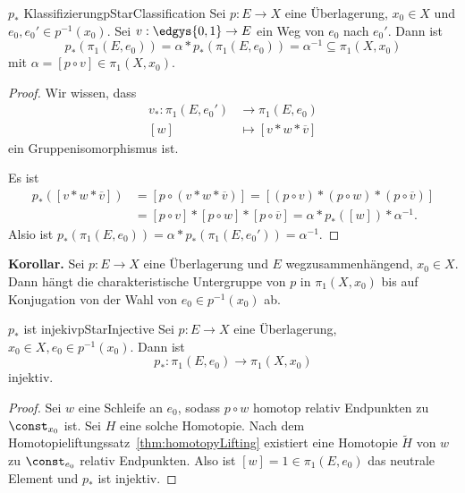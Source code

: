 \documentclass[language=ngerman]{TemplateLecture} %
\begin{document}
\begin{thm}{$p_*$ Klassifizierung}{pStarClassification}
    Sei $p: E \to X$ eine Überlagerung, $x_0 \in X$ und $e_0, e_0' \in p^{-1}(x_0)$. Sei $v: \edgys{0,1} \to E$ ein Weg von $e_0$ nach $e_0'$. Dann ist 
    \begin{equation*}
        p_*(\pi_1(E, e_0)) = \alpha * p_*(\pi_1(E,e_0)) = \alpha^{-1} \subseteq \pi_1(X, x_0)
    \end{equation*}
    mit $\alpha = [p \circ v] \in \pi_1(X, x_0)$.
\end{thm}

\begin{proof}
    Wir wissen, dass
    \begin{align*}
        v_*: \pi_1(E, e_0') &\longrightarrow \pi_1(E, e_0) \\
        [w] &\longmapsto [v * w * \overline{v}]
    \end{align*}
    ein Gruppenisomorphismus ist.

    Es ist 
    \begin{align*}
        p_*([v * w * \overline{v}]) &= [p \circ (v * w * \overline{v})] = [(p \circ v) * (p \circ w) * (p \circ \overline{v})] \\
        &= [p \circ v] * [p \circ w] * [p \circ \overline{v}] = \alpha * p_*([w]) * \alpha^{-1}.
    \end{align*}
    Alsio ist $p_*(\pi_1(E, e_0)) = \alpha * p_*(\pi_1(E, e_0')) = \alpha^{-1}$.
\end{proof}

\textbf{Korollar.} Sei $p: E \to X$ eine Überlagerung und $E$ wegzusammenhängend, $x_0 \in X$. Dann hängt die charakteristische
 Untergruppe von $p$ in $\pi_1(X, x_0)$ bis auf Konjugation von der Wahl von $e_0 \in p^{-1}(x_0)$ ab.



\begin{thm}{$p_*$ ist injekiv}{pStarInjective}
    Sei $p: E \to X$ eine Überlagerung, $x_0 \in X, e_0 \in p^{-1}(x_0)$. Dann ist 
    \begin{equation*}
        p_*: \pi_1(E, e_0) \to \pi_1(X, x_0)
    \end{equation*}
    injektiv.
\end{thm}
\begin{proof}
    Sei $w$ eine Schleife an $e_0$, sodass $p \circ w$ homotop relativ Endpunkten zu $\const_{x_0}$ ist. Sei $H$ eine solche Homotopie. Nach dem Homotopieliftungssatz~\ref{thm:homotopyLifting} existiert eine Homotopie $\tilde{H}$ von $w$ zu $\const_{e_0}$ relativ Endpunkten. Also ist $[w] = 1 \in \pi_1(E, e_0)$ das neutrale Element und $p_*$ ist injektiv.
\end{proof}
\end{document}
